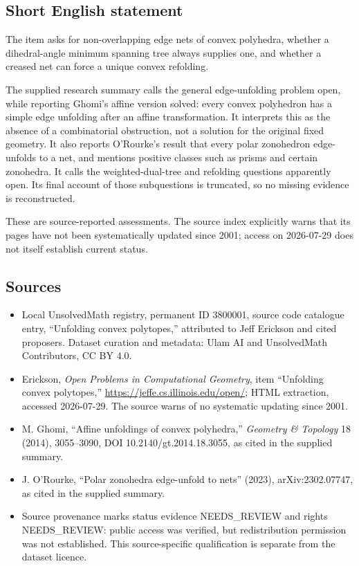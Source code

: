 \documentclass[11pt]{article}
\begin{document}
\subsection{Short English statement}
The item asks for non-overlapping edge nets of convex polyhedra, whether a dihedral-angle minimum spanning tree always supplies one, and whether a creased net can force a unique convex refolding.

The supplied research summary calls the general edge-unfolding problem open, while reporting Ghomi's affine version solved: every convex polyhedron has a simple edge unfolding after an affine transformation. It interprets this as the absence of a combinatorial obstruction, not a solution for the original fixed geometry. It also reports O'Rourke's result that every polar zonohedron edge-unfolds to a net, and mentions positive classes such as prisms and certain zonohedra. It calls the weighted-dual-tree and refolding questions apparently open. Its final account of those subquestions is truncated, so no missing evidence is reconstructed.

These are source-reported assessments. The source index explicitly warns that its pages have not been systematically updated since 2001; access on 2026-07-29 does not itself establish current status.
\subsection{Sources}
\begin{itemize}
\item Local UnsolvedMath registry, permanent ID 3800001, source code catalogue entry, ``Unfolding convex polytopes,'' attributed to Jeff Erickson and cited proposers. Dataset curation and metadata: Ulam AI and UnsolvedMath Contributors, CC BY 4.0.
\item Erickson, \emph{Open Problems in Computational Geometry}, item ``Unfolding convex polytopes,'' \url{https://jeffe.cs.illinois.edu/open/}; HTML extraction, accessed 2026-07-29. The source warns of no systematic updating since 2001.
\item M. Ghomi, ``Affine unfoldings of convex polyhedra,'' \emph{Geometry \& Topology} 18 (2014), 3055--3090, DOI 10.2140/gt.2014.18.3055, as cited in the supplied summary.
\item J. O'Rourke, ``Polar zonohedra edge-unfold to nets'' (2023), arXiv:2302.07747, as cited in the supplied summary.
\item Source provenance marks status evidence NEEDS\_REVIEW and rights NEEDS\_REVIEW: public access was verified, but redistribution permission was not established. This source-specific qualification is separate from the dataset licence.
\end{itemize}
\end{document}
